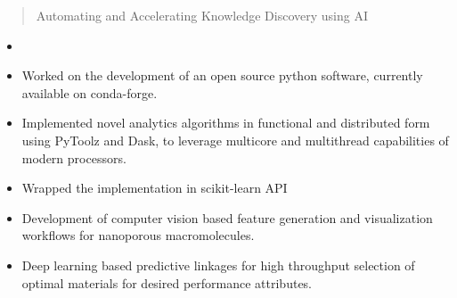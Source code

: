 \documentclass[10pt,a4paper]{altacv}
\begin{document}

\begin{fullwidth}
\makecvheader
\end{fullwidth}


\begin{quote}
Automating and Accelerating Knowledge Discovery using AI
\end{quote}


\begin{itemize}
\item {}
\item Worked on the development of an open source python software,
currently available on conda-forge.
\item Implemented novel analytics algorithms in functional
and distributed form using PyToolz and Dask, to leverage multicore and
multithread capabilities of modern processors.
\item Wrapped the implementation in scikit-learn API
\end{itemize}
\divider

\begin{itemize}
\item Development of computer vision based feature generation and visualization workflows for nanoporous
macromolecules.
\item Deep learning based predictive linkages for high throughput selection of optimal materials for
desired performance attributes.
\end{itemize}
\divider
\end{document}
